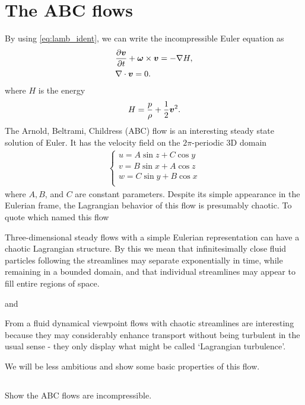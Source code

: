 \documentclass[11pt,letterpaper]{report}
\begin{document}
\section{The ABC flows}
By using \eqref{eq:lamb_ident}, we can write the incompressible Euler equation as
\begin{align}
    &\frac{\partial\boldsymbol{v}}{\partial t}+\boldsymbol{\omega}\times\boldsymbol{v} = -\nabla H,\\
    &\nabla\cdot\boldsymbol{v} = 0.
\end{align}
where $H$ is the energy
\begin{align}
    H = \frac{p}{\rho}+\frac{1}{2}\boldsymbol{v}^2.
\end{align}
The Arnold, Beltrami, Childress (ABC) flow is an interesting steady state solution of Euler. It has the velocity field on the $2\pi$-periodic 3D domain
\begin{align}
    \begin{cases}
        u= A\sin z+C\cos y\\
        v= B\sin x+A\cos z\\
        w= C\sin y+B\cos x\\
    \end{cases}
\end{align}
where $A,B$, and $C$ are constant parameters. Despite its simple appearance in the Eulerian frame, the Lagrangian behavior of this flow is presumably chaotic. To quote \cite{DombreEtAl_86} which named this flow
\begin{displayquote}
Three-dimensional steady flows with a simple Eulerian representation can have a chaotic Lagrangian structure. By this we mean that infinitesimally close fluid particles following the streamlines may separate exponentially in time, while remaining in a bounded domain, and that individual streamlines may appear to fill entire regions of space.
\end{displayquote}
and
\begin{displayquote}
    From a fluid dynamical viewpoint flows with chaotic streamlines are interesting because they may considerably enhance transport without being turbulent in the usual sense - they only display what might be called `Lagrangian turbulence'.
\end{displayquote}

We will be less ambitious and show some basic properties of this flow.
\subsection{}
Show the ABC flows are incompressible.
\end{document}

